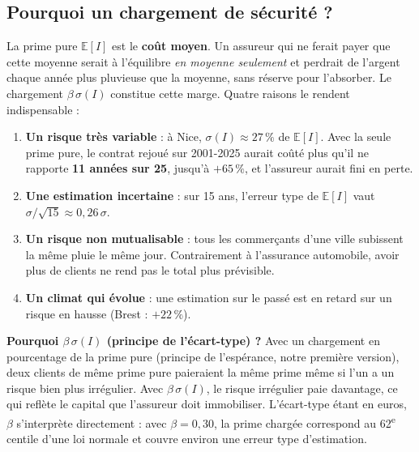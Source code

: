 \documentclass[11pt,a4paper]{article}
\begin{document}
\subsection{Pourquoi un chargement de sécurité ?}
La prime pure $\mathbb{E}[I]$ est le \textbf{coût moyen}. Un assureur qui ne ferait payer que cette moyenne serait à
l'équilibre \emph{en moyenne seulement} et perdrait de l'argent chaque année plus pluvieuse que la moyenne, sans réserve
pour l'absorber. Le chargement $\beta\,\sigma(I)$ constitue cette marge. Quatre raisons le rendent indispensable :
\begin{enumerate}
  \item \textbf{Un risque très variable} : à Nice, $\sigma(I) \approx 27\,\%$ de $\mathbb{E}[I]$. Avec la seule prime pure,
        le contrat rejoué sur 2001-2025 aurait coûté plus qu'il ne rapporte \textbf{11 années sur 25}, jusqu'à $+65\,\%$,
        et l'assureur aurait fini en perte.
  \item \textbf{Une estimation incertaine} : sur 15 ans, l'erreur type de $\mathbb{E}[I]$ vaut $\sigma/\sqrt{15} \approx 0{,}26\,\sigma$.
  \item \textbf{Un risque non mutualisable} : tous les commerçants d'une ville subissent la même pluie le même jour.
        Contrairement à l'assurance automobile, avoir plus de clients ne rend pas le total plus prévisible.
  \item \textbf{Un climat qui évolue} : une estimation sur le passé est en retard sur un risque en hausse (Brest : $+22\,\%$).
\end{enumerate}

\textbf{Pourquoi $\beta\,\sigma(I)$ (principe de l'écart-type) ?} Avec un chargement en pourcentage de la prime pure
(principe de l'espérance, notre première version), deux clients de même prime pure paieraient la même prime même si l'un
a un risque bien plus irrégulier. Avec $\beta\,\sigma(I)$, le risque irrégulier paie davantage, ce qui reflète le capital
que l'assureur doit immobiliser. L'écart-type étant en euros, $\beta$ s'interprète directement : avec $\beta = 0{,}30$, la
prime chargée correspond au 62\textsuperscript{e} centile d'une loi normale et couvre environ une erreur type d'estimation.
\end{document}
